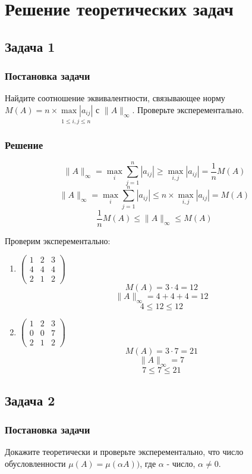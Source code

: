 \documentclass[14pt, a4paper]{extarticle}
\begin{document}
	\section{Решение теоретических задач}
		\subsection{Задача 1}
			\subsubsection{Постановка задачи}
			Найдите соотношение эквивалентности, связывающее норму $M(A) = n \times \underset{1 \leq i,j \leq n}{\max{|a_{ij}|}}$ с $\|A\|_{\infty}$. Проверьте эксперементально.
			\subsubsection{Решение}
				\[ \|A\|_{\infty} = \underset{i}{\max} \sum_{j=1}^{n}|a_{ij}| \geq \underset{i,j}{\max}|a_{ij}| = \dfrac{1}{n} M(A)  \]
				\[ \|A\|_{\infty} = \underset{i}{\max} \sum_{j=1}^{n}|a_{ij}| \leq n \times \underset{i,j}{\max}|a_{ij}| = M(A)  \]
				\[ \dfrac{1}{n}M(A) \leq \|A\|_{\infty} \leq M(A) \]
				
				Проверим эксперементально:
				\begin{enumerate}
					\item 
					$\begin{pmatrix}
						1 & 2 & 3\\
						4 & 4 & 4\\
						2 & 1 & 2	
					\end{pmatrix}$
					\[ M(A) = 3 \cdot 4 = 12 \]
					\[ \|A\|_{\infty} = 4+4+4 = 12 \]
					\[ 4 \leq 12 \leq 12 \]
					\item
					$\begin{pmatrix}
						1 & 2 & 3\\
						0 & 0 & 7\\
						2 & 1 & 2	
					\end{pmatrix}$
					\[ M(A) = 3 \cdot 7 = 21 \]
					\[ \|A\|_{\infty} = 7 \]
					\[ 7 \leq 7 \leq 21 \]
				\end{enumerate}
		\subsection{Задача 2}
		\subsubsection{Постановка задачи}
		Докажите теоретически и проверьте эксперементально, что число обусловленности 
		$\mu(A) = \mu(\alpha A))$, где $\alpha$ - число, $\alpha \neq 0$.
\end{document}
